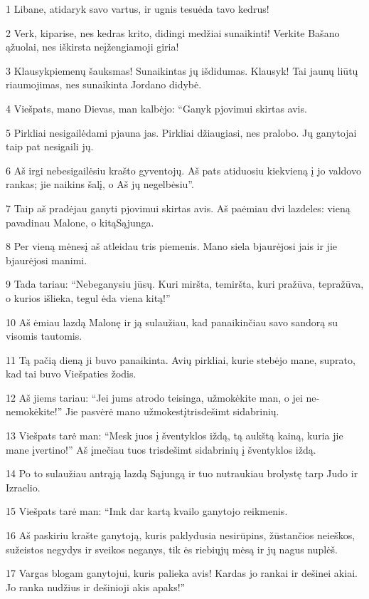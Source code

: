 \par 1 Libane, atidaryk savo vartus, ir ugnis tesuėda tavo kedrus! 
\par 2 Verk, kiparise, nes kedras krito, didingi medžiai sunaikinti! Verkite Bašano ąžuolai, nes iškirsta neįžengiamoji giria! 
\par 3 Klausyk­piemenų šauksmas! Sunaikintas jų išdidumas. Klausyk! Tai jaunų liūtų riaumojimas, nes sunaikinta Jordano didybė. 
\par 4 Viešpats, mano Dievas, man kalbėjo: “Ganyk pjovimui skirtas avis. 
\par 5 Pirkliai nesigailėdami pjauna jas. Pirkliai džiaugiasi, nes pralobo. Jų ganytojai taip pat nesigaili jų. 
\par 6 Aš irgi nebesigailėsiu krašto gyventojų. Aš pats atiduosiu kiekvieną į jo valdovo rankas; jie naikins šalį, o Aš jų negelbėsiu”. 
\par 7 Taip aš pradėjau ganyti pjovimui skirtas avis. Aš paėmiau dvi lazdeles: vieną pavadinau Malone, o kitą­Sąjunga. 
\par 8 Per vieną mėnesį aš atleidau tris piemenis. Mano siela bjaurėjosi jais ir jie bjaurėjosi manimi. 
\par 9 Tada tariau: “Nebeganysiu jūsų. Kuri miršta, temiršta, kuri pražūva, tepražūva, o kurios išlieka, tegul ėda viena kitą!” 
\par 10 Aš ėmiau lazdą Malonę ir ją sulaužiau, kad panaikinčiau savo sandorą su visomis tautomis. 
\par 11 Tą pačią dieną ji buvo panaikinta. Avių pirkliai, kurie stebėjo mane, suprato, kad tai buvo Viešpaties žodis. 
\par 12 Aš jiems tariau: “Jei jums atrodo teisinga, užmokėkite man, o jei ne­nemokėkite!” Jie pasvėrė mano užmokestį­trisdešimt sidabrinių. 
\par 13 Viešpats tarė man: “Mesk juos į šventyklos iždą, tą aukštą kainą, kuria jie mane įvertino!” Aš įmečiau tuos trisdešimt sidabrinių į šventyklos iždą. 
\par 14 Po to sulaužiau antrąją lazdą Sąjungą ir tuo nutraukiau brolystę tarp Judo ir Izraelio. 
\par 15 Viešpats tarė man: “Imk dar kartą kvailo ganytojo reikmenis. 
\par 16 Aš paskiriu krašte ganytoją, kuris paklydusia nesirūpins, žūstančios neieškos, sužeistos negydys ir sveikos neganys, tik ės riebiųjų mėsą ir jų nagus nuplėš. 
\par 17 Vargas blogam ganytojui, kuris palieka avis! Kardas jo rankai ir dešinei akiai. Jo ranka nudžius ir dešinioji akis apaks!”



